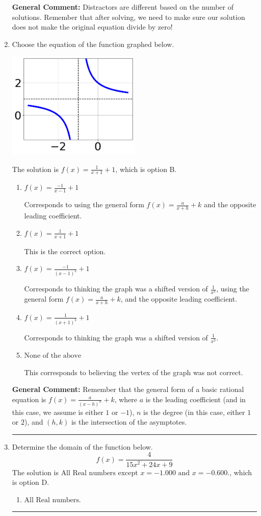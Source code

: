\documentclass{extbook}[14pt]
\newcommand{\litem}[1]{\item #1

\rule{\textwidth}{0.4pt}}
\begin{document}
\begin{enumerate}
{\textbf{General Comment:} Distractors are different based on the number of solutions. Remember that after solving, we need to make sure our solution does not make the original equation divide by zero!
}
\litem{
Choose the equation of the function graphed below.

\begin{center}
    \includegraphics[width=0.5\textwidth]{../Figures/rationalGraphToEquationB.png}
\end{center}


The solution is \( f(x) = \frac{1}{x + 1} + 1 \), which is option B.\begin{enumerate}[label=\Alph*.]
\item \( f(x) = \frac{-1}{x - 1} + 1 \)

Corresponds to using the general form $f(x) = \frac{a}{x+h}+k$ and the opposite leading coefficient.
\item \( f(x) = \frac{1}{x + 1} + 1 \)

This is the correct option.
\item \( f(x) = \frac{-1}{(x - 1)^2} + 1 \)

Corresponds to thinking the graph was a shifted version of $\frac{1}{x^2}$, using the general form $f(x) = \frac{a}{x+h}+k$, and the opposite leading coefficient.
\item \( f(x) = \frac{1}{(x + 1)^2} + 1 \)

Corresponds to thinking the graph was a shifted version of $\frac{1}{x^2}$.
\item \( \text{None of the above} \)

This corresponds to believing the vertex of the graph was not correct.
\end{enumerate}

\textbf{General Comment:} Remember that the general form of a basic rational equation is $ f(x) = \frac{a}{(x-h)^n} + k$, where $a$ is the leading coefficient (and in this case, we assume is either $1$ or $-1$), $n$ is the degree (in this case, either $1$ or $2$), and $(h, k)$ is the intersection of the asymptotes.
}
\litem{
Determine the domain of the function below.
\[ f(x) = \frac{4}{15x^{2} +24 x + 9} \]The solution is \( \text{All Real numbers except } x = -1.000 \text{ and } x = -0.600. \), which is option D.\begin{enumerate}[label=\Alph*.]
\item \( \text{All Real numbers.} \)


\end{enumerate}}
\end{enumerate}
\end{document}
